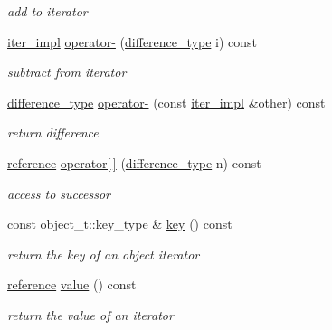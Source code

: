 \begin{DoxyCompactItemize}
\begin{DoxyCompactList}\small\item\em add to iterator \end{DoxyCompactList}\item 
\hyperlink{classnlohmann_1_1detail_1_1iter__impl}{iter\+\_\+impl} \hyperlink{classnlohmann_1_1detail_1_1iter__impl_aa719903e6d509db51744cfca9c95fd8e}{operator-\/} (\hyperlink{classnlohmann_1_1detail_1_1iter__impl_a2f7ea9f7022850809c60fc3263775840}{difference\+\_\+type} i) const 
\begin{DoxyCompactList}\small\item\em subtract from iterator \end{DoxyCompactList}\item 
\hyperlink{classnlohmann_1_1detail_1_1iter__impl_a2f7ea9f7022850809c60fc3263775840}{difference\+\_\+type} \hyperlink{classnlohmann_1_1detail_1_1iter__impl_a327f3f6a97c6d0cdfc9fe232949d916b}{operator-\/} (const \hyperlink{classnlohmann_1_1detail_1_1iter__impl}{iter\+\_\+impl} \&other) const 
\begin{DoxyCompactList}\small\item\em return difference \end{DoxyCompactList}\item 
\hyperlink{classnlohmann_1_1detail_1_1iter__impl_a5be8001be099c6b82310f4d387b953ce}{reference} \hyperlink{classnlohmann_1_1detail_1_1iter__impl_ade15572ccb7c5b9c2541ecfd65252e99}{operator\mbox{[}$\,$\mbox{]}} (\hyperlink{classnlohmann_1_1detail_1_1iter__impl_a2f7ea9f7022850809c60fc3263775840}{difference\+\_\+type} n) const 
\begin{DoxyCompactList}\small\item\em access to successor \end{DoxyCompactList}\item 
const object\+\_\+t\+::key\+\_\+type \& \hyperlink{classnlohmann_1_1detail_1_1iter__impl_ad14ac9338131d0be2c6bb41c715c2b27}{key} () const 
\begin{DoxyCompactList}\small\item\em return the key of an object iterator \end{DoxyCompactList}\item 
\hyperlink{classnlohmann_1_1detail_1_1iter__impl_a5be8001be099c6b82310f4d387b953ce}{reference} \hyperlink{classnlohmann_1_1detail_1_1iter__impl_adc4048d25e057ce8ec0b912642c24731}{value} () const 
\begin{DoxyCompactList}\small\item\em return the value of an iterator \end{DoxyCompactList}\end{DoxyCompactItemize}
